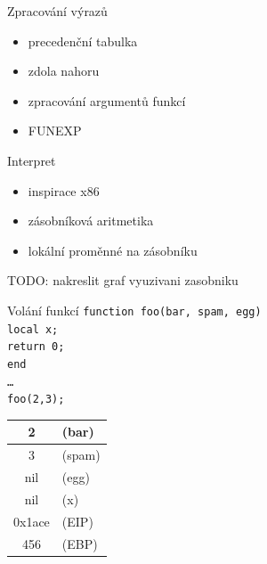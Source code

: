 \documentclass{beamer}
\begin{document}
\begin{frame}{Zpracování výrazů}
  \begin{itemize}
  \item precedenční tabulka
  \item zdola nahoru
  \item zpracování argumentů funkcí
  \item FUNEXP
  \end{itemize}
\end{frame}

\begin{frame}{Interpret}
  \begin{itemize}
  \item inspirace x86
  \item zásobníková aritmetika
  \item lokální proměnné na zásobníku
  \end{itemize}
  TODO: nakreslit graf vyuzivani zasobniku
\end{frame}

\begin{frame}{Volání funkcí}
  \tt{function foo(bar, spam, egg)\\\hspace{2em} local x;\\\hspace{2em} return 0;\\end}\\
  \ldots\\
  \tt{foo(2,3);}\\
  \begin{center}
  \begin{tabular}{|c l|}
    \hline
    2 & (bar)\\\hline
    3 & (spam)\\\hline
    nil & (egg)\\\hline
    nil & (x)\\\hline
    0x1ace & (EIP)\\\hline
    456 & (EBP)\\\hline
  \end{tabular}
  \end{center}
\end{frame}
\end{document}
